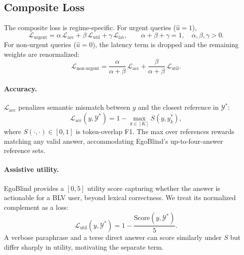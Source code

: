 \documentclass{article}
\begin{document}
\subsection{Composite Loss}\label{sec:composite_loss}
The composite loss is regime-specific. For urgent queries ($\hat{u} = 1$),
\begin{equation}
    \mathcal{L}_{\text{urgent}} = \alpha\,\mathcal{L}_{\text{acc}} + \beta\,\mathcal{L}_{\text{util}} + \gamma\,\mathcal{L}_{\text{lat}}, \qquad \alpha + \beta + \gamma = 1, \quad \alpha, \beta, \gamma > 0.
\end{equation}
For non-urgent queries ($\hat{u} = 0$), the latency term is dropped and the remaining weights are renormalized:
\begin{equation}
    \mathcal{L}_{\text{non-urgent}} = \frac{\alpha}{\alpha + \beta}\,\mathcal{L}_{\text{acc}} + \frac{\beta}{\alpha + \beta}\,\mathcal{L}_{\text{util}}.
\end{equation}

\paragraph{Accuracy.} $\mathcal{L}_{\text{acc}}$ penalizes semantic mismatch between $y$ and the closest reference in $\mathcal{Y}^*$:
\begin{equation}
    \mathcal{L}_{\text{acc}}(y, \mathcal{Y}^*) = 1 - \max_{k \in [K]} S(y, y_k^*),
\end{equation}
where $S(\cdot,\cdot) \in [0,1]$ is token-overlap F1. The max over references rewards matching any valid answer, accommodating EgoBlind's up-to-four-answer reference sets.

\paragraph{Assistive utility.} EgoBlind provides a $[0,5]$ utility score capturing whether the answer is actionable for a BLV user, beyond lexical correctness. We treat its normalized complement as a loss:
\begin{equation}
    \mathcal{L}_{\text{util}}(y, \mathcal{Y}^*) = 1 - \frac{\text{Score}(y, \mathcal{Y}^*)}{5}.
\end{equation}
A verbose paraphrase and a terse direct answer can score similarly under $S$ but differ sharply in utility, motivating the separate term.
\end{document}
